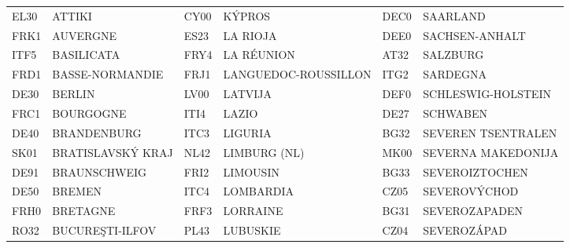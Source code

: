 \documentclass[a4paper,11pt,oneside]{article}
\begin{document}
\begin{table}
{\begin{tabular}{llllll}
EL30                & ATTIKI                      & CY00                & KÝPROS                     & DEC0                & SAARLAND                                                    \\
FRK1                & AUVERGNE                    & ES23                & LA RIOJA                   & DEE0                & SACHSEN-ANHALT                                              \\
ITF5                & BASILICATA                  & FRY4                & LA RÉUNION                 & AT32                & SALZBURG                                                    \\
FRD1                & BASSE-NORMANDIE             & FRJ1                & LANGUEDOC-ROUSSILLON       & ITG2                & SARDEGNA                                                    \\
DE30                & BERLIN                      & LV00                & LATVIJA                    & DEF0                & SCHLESWIG-HOLSTEIN                                          \\
FRC1                & BOURGOGNE                   & ITI4                & LAZIO                      & DE27                & SCHWABEN                                                    \\
DE40                & BRANDENBURG                 & ITC3                & LIGURIA                    & BG32                & SEVEREN TSENTRALEN                                          \\
SK01                & BRATISLAVSKÝ KRAJ           & NL42                & LIMBURG (NL)               & MK00                & SEVERNA MAKEDONIJA                                          \\
DE91                & BRAUNSCHWEIG                & FRI2                & LIMOUSIN                   & BG33                & SEVEROIZTOCHEN                                              \\
DE50                & BREMEN                      & ITC4                & LOMBARDIA                  & CZ05                & SEVEROVÝCHOD                                                \\
FRH0                & BRETAGNE                    & FRF3                & LORRAINE                   & BG31                & SEVEROZAPADEN                                               \\
RO32                & BUCUREŞTI-ILFOV             & PL43                & LUBUSKIE                   & CZ04                & SEVEROZÁPAD                                                 \\

\end{tabular}}
\end{table}
\end{document}
